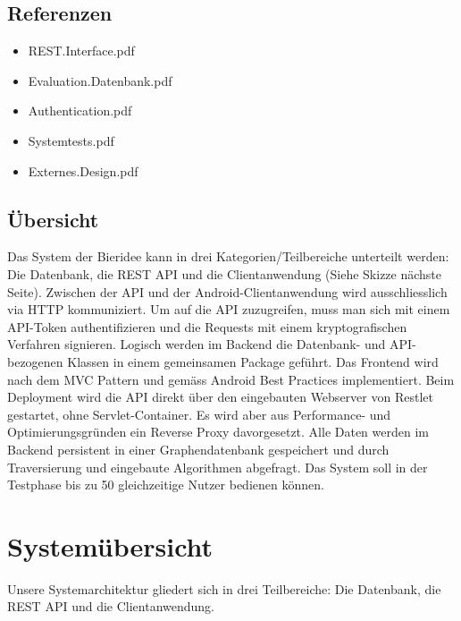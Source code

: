 \documentclass[10pt,a4paper]{scrartcl}
\begin{document}
\subsection{Referenzen}

\begin{itemize}
	\item REST.Interface.pdf
	\item Evaluation.Datenbank.pdf
	\item Authentication.pdf
	\item Systemtests.pdf
	\item Externes.Design.pdf
\end{itemize}

\subsection{Übersicht}

Das System der Bieridee kann in drei Kategorien/Teilbereiche unterteilt werden: Die Datenbank, die REST API und die Clientanwendung (Siehe Skizze nächste Seite). Zwischen der API und der Android-Clientanwendung wird
ausschliesslich via HTTP kommuniziert. Um auf die API zuzugreifen, muss man sich mit einem
API-Token authentifizieren und die Requests mit einem kryptografischen Verfahren signieren. 
Logisch werden im Backend die Datenbank- und API-bezogenen Klassen in einem gemeinsamen Package
geführt. Das Frontend wird nach dem MVC Pattern und gemäss Android Best Practices implementiert.  Beim Deployment wird die API direkt über den eingebauten Webserver von Restlet gestartet, ohne
Servlet-Container. Es wird aber aus Performance- und Optimierungsgründen ein Reverse Proxy
davorgesetzt. Alle Daten werden im Backend persistent in einer Graphendatenbank gespeichert und
durch Traversierung und eingebaute Algorithmen abgefragt. Das System soll in der Testphase bis zu
50 gleichzeitige Nutzer bedienen können.

\newpage
\section{Systemübersicht}
Unsere Systemarchitektur gliedert sich in drei Teilbereiche: Die Datenbank, die REST API
und die Clientanwendung.
\end{document}
